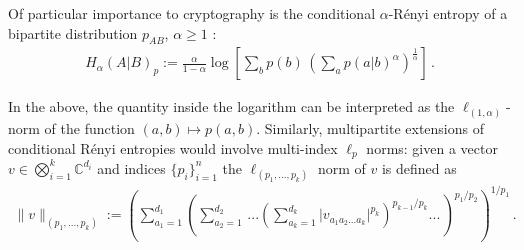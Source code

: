 \documentclass[11pt]{article}
\newcommand{\OF}[1]{\textcolor{blue}{OF:~#1}}
\newcommand{\1}{\ensuremath{\mathbbm{1}}}
\theoremstyle{newdefinition}
\theoremstyle{newplain}
\theoremstyle{myplain}
\begin{document}

Of particular importance to cryptography is the conditional $\alpha$-R\'{e}nyi entropy of a bipartite distribution $p_{AB}$, $\alpha\ge 1$ \cite{Arimoto.1977}: 
\begin{align}
H_\alpha(A|B)_p:=\frac{\alpha}{1-\alpha}\log \left[\sum_b p(b)\, \left(\sum_ap(a|b)^\alpha\right)^{\frac{1}{\alpha}}\right]\,.
\end{align}



In the above, the quantity inside the logarithm can be interpreted as the $\ell_{(1,\alpha)}$-norm of the function $(a,b)\mapsto p(a,b)$. Similarly, multipartite extensions of conditional R\'{e}nyi entropies would involve multi-index $\ell_p$ norms: given a vector $v\in\bigotimes_{i=1}^k\mathbb{C}^{d_i}$ and indices $\{p_i\}_{i=1}^n$ the $\ell_{(p_1,...,p_k)}$ norm of $v$ is defined as 
\begin{align} 
    \|v\|_{(p_1,...,p_k)} := \left(\sum_{a_1=1}^{d_1}\left(\sum_{a_2=1}^{d_2}\,... \left(\sum_{a_k=1}^{d_k}\big|v_{a_1a_2...a_k}\big|^{p_k}\right)^{p_{k-1}/p_k} ...\,\right)^{p_1/p_2}\right)^{{1/p_1}}\,.
\end{align}
\end{document}
